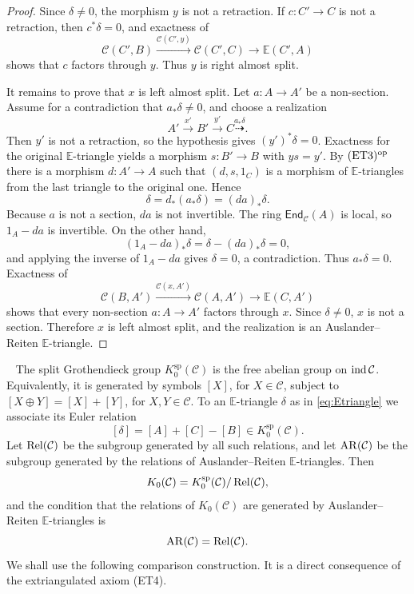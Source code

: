 \documentclass[11pt, twoside]{article}
\def\C{\mathcal{C}}
\def\E{\mathbb{E}}
\numberwithin{equation}{section}
\def\End{\mathsf{End}}
\begin{document}
\begin{proof}
Since $\delta\ne0$, the morphism $y$ is not a retraction.  If
$c\colon C'\to C$ is not a retraction, then $c^*\delta=0$, and exactness of
\[
 \C(C',B)\xrightarrow{\C(C',y)}\C(C',C)
 \longrightarrow\E(C',A)
\]
shows that $c$ factors through $y$.  Thus $y$ is right almost split.

It remains to prove that $x$ is left almost split.  Let $a\colon A\to A'$ be a non-section.  Assume for a contradiction that $a_*\delta\ne0$, and choose a realization
$$
 A'\xrightarrow{x'}B'\xrightarrow{y'}C
 \overset{a_*\delta}{\dashrightarrow}.
$$
Then $y'$ is not a retraction, so the hypothesis gives
$(y')^*\delta=0$.  Exactness for the original $\E$-triangle yields a
morphism $s\colon B'\to B$ with $ys=y'$.  By $\rm (ET3)^{\rm op}$ there is a
morphism $d\colon A'\to A$ such that $(d,s,1_C)$ is a morphism of
$\E$-triangles from the last triangle to the original one.  Hence
\[
 \delta=d_*(a_*\delta)=(da)_*\delta.
\]
Because $a$ is not a section, $da$ is not invertible.  The ring
$\End_\C(A)$ is local, so $1_A-da$ is invertible.  On the other hand,
\[
 (1_A-da)_*\delta=\delta-(da)_*\delta=0,
\]
and applying the inverse of $1_A-da$ gives $\delta=0$, a contradiction.
Thus $a_*\delta=0$.  Exactness of
\[
 \C(B,A')\xrightarrow{\C(x,A')}\C(A,A')
 \longrightarrow\E(C,A')
\]
shows that every non-section $a\colon A\to A'$ factors through $x$.
Since $\delta\ne0$, $x$ is not a section.  Therefore $x$ is left almost
split, and the realization is an Auslander--Reiten $\E$-triangle.
\end{proof}

\hspace{-5mm}{\bf 2.3 Grothendieck groups and local finiteness.}~
The split Grothendieck group $K_0^{\mathrm{sp}}(\C)$ is the free abelian group
on $\ind\C$.  Equivalently, it is generated by symbols $[X]$, for $X\in \C$, subject to
$[X\oplus Y]=[X]+[Y]$, for $X,Y\in \C$.  To an $\E$-triangle
$\delta$ as in \eqref{eq:Etriangle} we associate its Euler relation
\[
 [\delta]=[A]+[C]-[B]\in K_0^{\mathrm{sp}}(\C).
\]
Let $\Rel(\C)$ be the subgroup generated by all such relations, and let
$\AR(\C)$ be the subgroup generated by the relations of Auslander--Reiten
$\E$-triangles.  Then
\[
 K_0(\C)=K_0^{\mathrm{sp}}(\C)/\Rel(\C),
\]
and the condition that the relations of $K_0(\C)$ are generated by
Auslander--Reiten $\E$-triangles is
\[
 \AR(\C)=\Rel(\C).
\]
We shall use the following comparison construction.  It is a direct
consequence of the extriangulated axiom (ET4).
\end{document}
